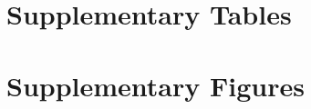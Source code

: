 \documentclass{article}
\newcommand{\good}[1]{\textcolor{green!50!black}{#1}}
\begin{document}
\renewcommand{\tablename}{Supplementary Table}
\renewcommand{\figurename}{Supplementary Figure}

\newpage
\section{Supplementary Tables}









\newpage

\section{Supplementary Figures}
\end{document}
